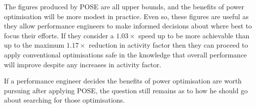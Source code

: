 
The figures produced by POSE are all upper bounds, and the benefits of power optimisation will be more modest in practice. Even so, these figures are useful as they allow performance engineers to make informed decisions about where best to focus their efforts. If they consider a $1.03 \times$ speed up to be more achievable than up to the maximum $1.17\times$ reduction in activity factor then they can proceed to apply conventional optimisations safe in the knowledge that overall performance will improve despite any increases in activity factor.

If a performance engineer decides the benefits of power optimisation are worth pursuing after applying POSE, the question still remains as to how he should go about searching for those optimisations.
